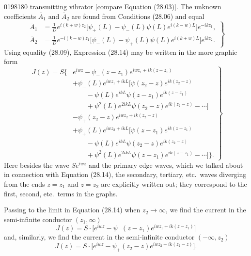 \begin{scanpage}{0198}{180}
\noindent transmitting vibrator [compare Equation (28.03)]. The unknown coefficients $\bar A_1$ and $\bar A_2$ are found from Conditions (28.06) and equal
\[
\left.\begin{aligned}
\bar A_1&=\frac1D e^{i(k+w)z_2}\bigl[\psi_+(L)-\psi_-(L)\psi(L)e^{i(k-w)L}\bigr]e^{-ikz_1},\\
\bar A_2&=\frac1D e^{-i(k-w)z_1}\bigl[\psi_-(L)-\psi_+(L)\psi(L)e^{i(k+w)L}\bigr]e^{ikz_2}.
\end{aligned}\right\}\tag{28.17}
\]
Using equality (28.09), Expression (28.14) may be written in the more graphic form
\[
\left.\begin{aligned}
J(z)=S\bigl\{&e^{iwz}-\psi_-(z-z_1)e^{iwz_1+ik(z-z_1)}\\
&+\psi_-(L)e^{iwz_1+ikL}\bigl[\psi(z_2-z)e^{ik(z_2-z)}\\
&\qquad-\psi(L)e^{ikL}\psi(z-z_1)e^{ik(z-z_1)}\\
&\qquad+\psi^2(L)e^{2ikL}\psi(z_2-z)e^{ik(z_2-z)}-\cdots\bigr]\\
&-\psi_+(z_2-z)e^{iwz_2+ik(z_2-z)}\\
&+\psi_+(L)e^{iwz_2+ikL}\bigl[\psi(z-z_1)e^{ik(z-z_1)}\\
&\qquad-\psi(L)e^{ikL}\psi(z_2-z)e^{ik(z_2-z)}\\
&\qquad+\psi^2(L)e^{2ikL}\psi(z-z_1)e^{ik(z-z_1)}-\cdots\bigr]\bigr\}.
\end{aligned}\right\}\tag{28.18}
\]
Here besides the wave $Se^{iwz}$ and the primary edge waves, which we talked about in connection with Equation (28.14), the secondary, tertiary, etc.\ waves diverging from the ends $z=z_1$ and $z=z_2$ are explicitly written out; they correspond to the first, second, etc.\ terms in the graphs.

Passing to the limit in Equation (28.14) when $z_2\to\infty$, we find the current in the semi-infinite conductor $(z_1,\infty)$
\[
J(z)=S\cdot\bigl[e^{iwz}-\psi_-(z-z_1)e^{iwz_1+ik(z-z_1)}\bigr]\tag{28.19}
\]
and, similarly, we find the current in the semi-infinite conductor $(-\infty,z_2)$
\[
J(z)=S\cdot\bigl[e^{iwz}-\psi_+(z_2-z)e^{iwz_2+ik(z_2-z)}\bigr].\tag{28.20}
\]
\end{scanpage}
